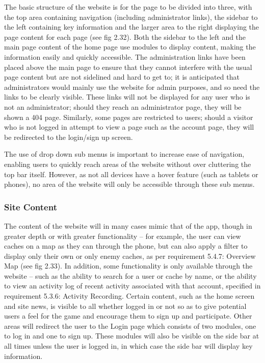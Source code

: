 The basic structure of the website is for the page to be divided into three, with the top area containing navigation (including administrator links), the sidebar to the left containing key information and the larger area to the right displaying the page content for each page (see fig 2.32). Both the sidebar to the left and the main page content of the home page use modules to display content, making the information easily and quickly accessible. The administration links have been placed above the main page to ensure that they cannot interfere with the usual page content but are not sidelined and hard to get to; it is anticipated that administrators would mainly use the website for admin purposes, and so need the links to be clearly visible. These links will not be displayed for any user who is not an administrator; should they reach an administrator page, they will be shown a 404 page. Similarly, some pages are restricted to users; should a visitor who is not logged in attempt to view a page such as the account page, they will be redirected to the login/sign up screen.

The use of drop down sub menus is important to increase ease of navigation, enabling users to quickly reach areas of the website without over cluttering the top bar itself. However, as not all devices have a hover feature (such as tablets or phones), no area of the website will only be accessible through these sub menus.

\subsubsection{Site Content}

The content of the website will in many cases mimic that of the app, though in greater depth or with greater functionality – for example, the user can view caches on a map as they can through the phone, but can also apply a filter to display only their own or only enemy caches, as per requirement 5.4.7: Overview Map (see fig 2.33). In addition, some functionality is only available through the website – such as the ability to search for a user or cache by name, or the ability to view an activity log of recent activity associated with that account, specified in requirement 5.3.6: Activity Recording. Certain content, such as the home screen and site news, is visible to all whether logged in or not so as to give potential users a feel for the game and encourage them to sign up and participate. Other areas will redirect the user to the Login page which consists of two modules, one to log in and one to sign up. These modules will also be visible on the side bar at all times unless the user is logged in, in which case the side bar will display key information.


